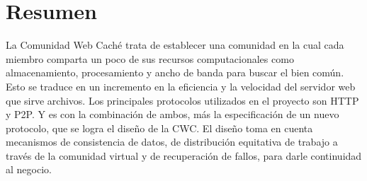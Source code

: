 

\begingroup
\let\clearpage\relax
\let\cleardoublepage\relax
\let\cleardoublepage\relax

\chapter*{Resumen} %

La Comunidad Web Caché trata de establecer una comunidad en la cual cada miembro comparta un poco de sus recursos computacionales como almacenamiento, procesamiento y ancho de banda para buscar el bien común. Esto se traduce en un incremento en la eficiencia y la velocidad del servidor web que sirve archivos. Los principales protocolos utilizados en el proyecto son HTTP y P2P. Y es con la combinación de ambos, más la especificación de un nuevo protocolo, que se logra el diseño de la CWC. El diseño toma en cuenta mecanismos de consistencia de datos, de distribución equitativa de trabajo a través de la comunidad virtual y de recuperación de fallos, para darle continuidad al negocio. 

\endgroup			

\vfill